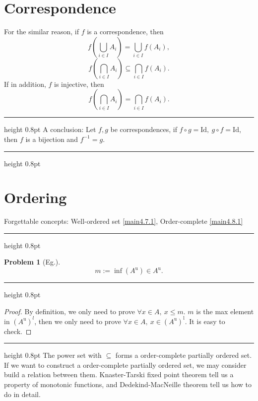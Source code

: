 \documentclass{article}
\newcommand{\singleline}{\hrule height 0.8pt}
\theoremstyle{1}
\newtheorem{problem}{Problem}[section]
\begin{document}
\section{Correspondence}
For the similar reason, if $f$ is a correspondence, then
\begin{equation}
    f\left(\bigcup_{i\in I}A_i \right)=\bigcup_{i\in I}f\left(A_i\right),
\end{equation}
\begin{equation}
    f\left(\bigcap_{i\in I}A_i \right)\subseteq\bigcap_{i\in I}f\left(A_i\right).
\end{equation}
If in addition, $f$ is injective, then
\begin{equation}
    f\left(\bigcap_{i\in I}A_i \right)=\bigcap_{i\in I}f\left(A_i\right).
\end{equation}
\singleline
A conclusion: Let $f,g$ be correspondences, if $f\circ g=\mathrm{Id},\ g\circ f=\mathrm{Id}$, then $f$ is a bijection and $f^{-1}=g$.
\singleline

\section{Ordering}
Forgettable concepts: Well-ordered set \ref{main4.7.1}, Order-complete \ref{main4.8.1}
\singleline
\begin{problem}[Eg.]
$$m:=\inf(A^\mathrm{u})\in A^\mathrm{u}.$$
\end{problem}
\singleline
\begin{proof}
    
 By definition, we only need to prove $\forall x\in A, \ x\le m$. $m$ is the max element in $\left(A^\mathrm{u}\right)^l$, then we only need to prove $\forall x\in A,\ x\in \left(A^\mathrm{u}\right)^\mathrm{l}$. It is easy to check.

\end{proof}
\singleline
The power set with $\subseteq$ forms a order-complete partially ordered set. If we want to construct a order-complete partially ordered set, we may consider build a relation between them. Knaster-Tarski fixed point theorem tell us a property of monotonic functions,  and Dedekind-MacNeille theorem tell us how to do in detail.

\newpage
\end{document}
